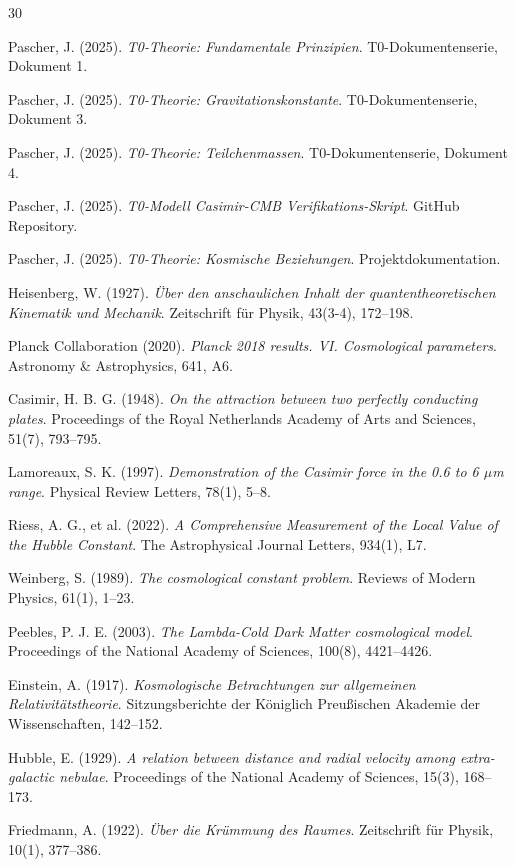 	
	\begin{thebibliography}{30}
		
		Pascher, J. (2025). 
		\textit{T0-Theorie: Fundamentale Prinzipien}. 
		T0-Dokumentenserie, Dokument 1.
		
		Pascher, J. (2025). 
		\textit{T0-Theorie: Gravitationskonstante}. 
		T0-Dokumentenserie, Dokument 3.
		
		Pascher, J. (2025). 
		\textit{T0-Theorie: Teilchenmassen}. 
		T0-Dokumentenserie, Dokument 4.
		
		Pascher, J. (2025). 
		\textit{T0-Modell Casimir-CMB Verifikations-Skript}. 
		GitHub Repository. 

		Pascher, J. (2025). 
		\textit{T0-Theorie: Kosmische Beziehungen}. 
		Projektdokumentation. 

		Heisenberg, W. (1927). 
		\textit{Über den anschaulichen Inhalt der quantentheoretischen Kinematik und Mechanik}. 
		Zeitschrift für Physik, 43(3-4), 172--198.
		
		Planck Collaboration (2020). 
		\textit{Planck 2018 results. VI. Cosmological parameters}. 
		Astronomy \& Astrophysics, 641, A6.
		
		Casimir, H. B. G. (1948). 
		\textit{On the attraction between two perfectly conducting plates}. 
		Proceedings of the Royal Netherlands Academy of Arts and Sciences, 51(7), 793--795.
		
		Lamoreaux, S. K. (1997). 
		\textit{Demonstration of the Casimir force in the 0.6 to 6 $\mu$m range}. 
		Physical Review Letters, 78(1), 5--8.
		
		Riess, A. G., et al. (2022). 
		\textit{A Comprehensive Measurement of the Local Value of the Hubble Constant}. 
		The Astrophysical Journal Letters, 934(1), L7.
		
		Weinberg, S. (1989). 
		\textit{The cosmological constant problem}. 
		Reviews of Modern Physics, 61(1), 1--23.
		
		Peebles, P. J. E. (2003). 
		\textit{The Lambda-Cold Dark Matter cosmological model}. 
		Proceedings of the National Academy of Sciences, 100(8), 4421--4426.
		
		Einstein, A. (1917). 
		\textit{Kosmologische Betrachtungen zur allgemeinen Relativitätstheorie}. 
		Sitzungsberichte der Königlich Preußischen Akademie der Wissenschaften, 142--152.
		
		Hubble, E. (1929). 
		\textit{A relation between distance and radial velocity among extra-galactic nebulae}. 
		Proceedings of the National Academy of Sciences, 15(3), 168--173.
		
		Friedmann, A. (1922). 
		\textit{Über die Krümmung des Raumes}. 
		Zeitschrift für Physik, 10(1), 377--386.
		
	\end{thebibliography}
